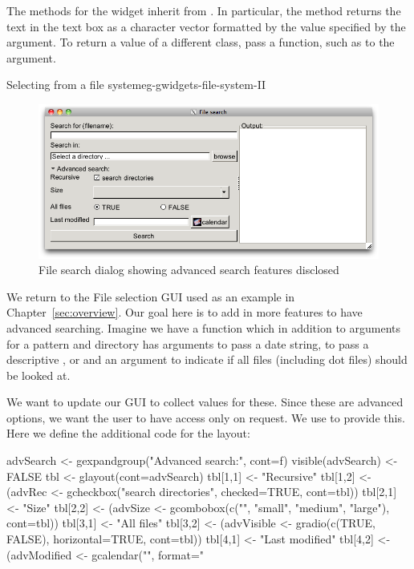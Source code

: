 The methods for the widget inherit from . In particular,
the  method returns the text in the text box
as a character vector formatted by the value specified by the
 argument. To return a value of a
different class, pass a function, such as  to the
 argument.



\begin{example}{Selecting from a file system}{eg-gwidgets-file-system-II}
\begin{figure}
  \centering
  \includegraphics[width=.8\textwidth]{fig-gWidgets-file-search-advanced.png}
  \caption{File search dialog showing advanced search features disclosed}
  \label{fig:file-search-advanced}
\end{figure}
We return to the File selection GUI used as an example in
Chapter~\ref{sec:overview}. Our goal here is to add in more features
to have advanced searching. Imagine we have a function  which in
addition to arguments for  a pattern and directory has arguments
 to pass a date string,  to pass a
descriptive ,  or  and an
argument  to indicate if all files (including dot files)
should be looked at. 

We want to update our GUI to collect values for these.
Since these are advanced options, we want the user to have access only
on request. We use  to provide this. Here we define
the additional code for the layout:


\begin{Schunk}
\begin{Sinput}
 advSearch <- gexpandgroup("Advanced search:", cont=f)
 visible(advSearch) <- FALSE
 tbl <- glayout(cont=advSearch)
 tbl[1,1] <- "Recursive"
 tbl[1,2] <- (advRec <- 
    gcheckbox("search directories", checked=TRUE, cont=tbl))
 tbl[2,1] <- "Size"
 tbl[2,2] <- (advSize <- 
    gcombobox(c("", "small", "medium", "large"),  cont=tbl))
 tbl[3,1] <- "All files"
 tbl[3,2] <- (advVisible <- 
    gradio(c(TRUE, FALSE), horizontal=TRUE, cont=tbl))
 tbl[4,1] <- "Last modified"
 tbl[4,2] <- (advModified <- 
              gcalendar("", format="%
\end{Sinput}
\end{Schunk}


\end{example}
